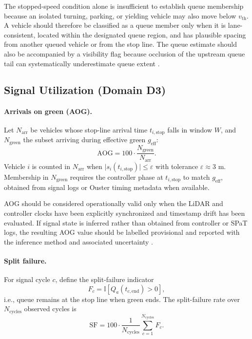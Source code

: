 \documentclass[11pt]{article}
\newcommand{\ind}{\mathbb{I}}
\begin{document}
The stopped-speed condition alone is insufficient to establish queue
membership because an isolated turning, parking, or yielding vehicle may also
move below $v_{\mathrm{th}}$. A vehicle should therefore be classified as a
queue member only when it is lane-consistent, located within the designated
queue region, and has plausible spacing from another queued vehicle or from
the stop line. The queue estimate should also be accompanied by a visibility
flag because occlusion of the upstream queue tail can systematically
underestimate queue extent
\cite{liu2009queue,ashqer2022uav,kloeker2020multilidar}.

\subsection{Signal Utilization (Domain D3)}

\paragraph{Arrivals on green (AOG).} Let $N_{\mathrm{arr}}$ be vehicles whose stop-line arrival time $t_{i,\mathrm{stop}}$ falls in window $W$, and $N_{\mathrm{green}}$ the subset arriving during effective green $g_{\mathrm{eff}}$:
\begin{equation}
 \mathrm{AOG}=100\cdot\frac{N_{\mathrm{green}}}{N_{\mathrm{arr}}}.
\end{equation}
Vehicle $i$ is counted in $N_{\mathrm{arr}}$ when $\lvert s_i(t_{i,\mathrm{stop}})\rvert\leq\varepsilon$ with tolerance $\varepsilon\approx3$ m. Membership in $N_{\mathrm{green}}$ requires the controller phase at $t_{i,\mathrm{stop}}$ to match $g_{\mathrm{eff}}$, obtained from signal logs or Ouster timing metadata when available.

AOG should be considered operationally valid only when the LiDAR and
controller clocks have been explicitly synchronized and timestamp drift has
been evaluated. If signal state is inferred rather than obtained from
controller or SPaT logs, the resulting AOG value should be labelled
provisional and reported with the inference method and associated uncertainty
\cite{fhwa2020atspm}.

\paragraph{Split failure.} For signal cycle $c$, define the split-failure indicator
\begin{equation}
 F_c=\ind\!\left[Q_a(t_{c,\mathrm{end}})>0\right],
\end{equation}
i.e., queue remains at the stop line when green ends. The split-failure rate over $N_{\mathrm{cycles}}$ observed cycles is
\begin{equation}
 \mathrm{SF}=100\cdot\frac{1}{N_{\mathrm{cycles}}}
 \sum_{c=1}^{N_{\mathrm{cycles}}}F_c.
\end{equation}
\end{document}
